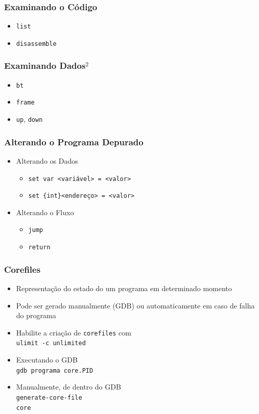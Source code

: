 \documentclass[xcolor=pdftex,dvipsnames,table,t]{beamer}
\begin{document}
\begin{frame}[fragile]
	\frametitle{Examinando o Código}
	  \begin{itemize}
	    \item{\verb|list|}
	    \item{\verb|disassemble|}
	  \end{itemize}
\end{frame}

\begin{frame}[fragile]
	\frametitle{Examinando Dados$^2$}
	  \begin{itemize}
	    \item{\verb|bt|}
	    \item{\verb|frame|}
	    \item{\verb|up|, \verb|down|}
	  \end{itemize}
\end{frame}

\begin{frame}[fragile]
	\frametitle{Alterando o Programa Depurado}
	  \begin{itemize}
	    \item{Alterando os Dados}
	      \begin{itemize}
		\item{\verb|set var <variável> = <valor>|}
		\item{\verb|set {int}<endereço> = <valor>|}
	      \end{itemize}
	    \item{Alterando o Fluxo}
	      \begin{itemize}
		\item{\verb|jump|}
		\item{\verb|return|}
	      \end{itemize}
	  \end{itemize}
\end{frame}

\begin{frame}[fragile]
	\frametitle{Corefiles}
	  \begin{itemize}
	  \item{Representação do estado do um programa em determinado momento}
	  \item{Pode ser gerado manualmente (GDB) ou automaticamente em caso de falha do programa}
	  \item{Habilite a criação de \verb|corefiles| com \\
		\verb|ulimit -c unlimited|}
	  \item{Executando o GDB \\
		\verb|gdb programa core.PID|}
	  \item{Manualmente, de dentro do GDB \\
		\verb|generate-core-file| \\
		\verb|core|}
	  \end{itemize}
\end{frame}
\end{document}
